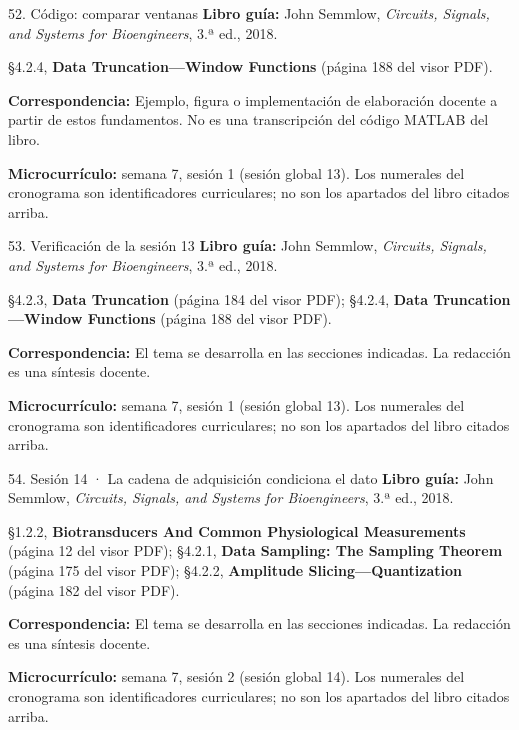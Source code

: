 \documentclass[
  10pt,
  ignorenonframetext,
  aspectratio=169,
  spanish,
]{beamer}
\begin{document}
\begin{frame}{52. Código: comparar ventanas}
\label{cuxf3digo-comparar-ventanas}
\textbf{Libro guía:} John Semmlow, \emph{Circuits, Signals, and Systems
for Bioengineers}, 3.ª ed., 2018.

§4.2.4, \textbf{Data Truncation---Window Functions} (página 188 del
visor PDF).

\textbf{Correspondencia:} Ejemplo, figura o implementación de
elaboración docente a partir de estos fundamentos. No es una
transcripción del código MATLAB del libro.

\textbf{Microcurrículo:} semana 7, sesión 1 (sesión global 13). Los
numerales del cronograma son identificadores curriculares; no son los
apartados del libro citados arriba.
\end{frame}

\begin{frame}{53. Verificación de la sesión 13}
\label{verificaciuxf3n-de-la-sesiuxf3n-13}
\textbf{Libro guía:} John Semmlow, \emph{Circuits, Signals, and Systems
for Bioengineers}, 3.ª ed., 2018.

§4.2.3, \textbf{Data Truncation} (página 184 del visor PDF); §4.2.4,
\textbf{Data Truncation---Window Functions} (página 188 del visor PDF).

\textbf{Correspondencia:} El tema se desarrolla en las secciones
indicadas. La redacción es una síntesis docente.

\textbf{Microcurrículo:} semana 7, sesión 1 (sesión global 13). Los
numerales del cronograma son identificadores curriculares; no son los
apartados del libro citados arriba.
\end{frame}

\begin{frame}{54. Sesión 14 · La cadena de adquisición condiciona el
dato}
\label{sesiuxf3n-14-la-cadena-de-adquisiciuxf3n-condiciona-el-dato}
\textbf{Libro guía:} John Semmlow, \emph{Circuits, Signals, and Systems
for Bioengineers}, 3.ª ed., 2018.

§1.2.2, \textbf{Biotransducers And Common Physiological Measurements}
(página 12 del visor PDF); §4.2.1, \textbf{Data Sampling: The Sampling
Theorem} (página 175 del visor PDF); §4.2.2, \textbf{Amplitude
Slicing---Quantization} (página 182 del visor PDF).

\textbf{Correspondencia:} El tema se desarrolla en las secciones
indicadas. La redacción es una síntesis docente.

\textbf{Microcurrículo:} semana 7, sesión 2 (sesión global 14). Los
numerales del cronograma son identificadores curriculares; no son los
apartados del libro citados arriba.
\end{frame}
\end{document}
